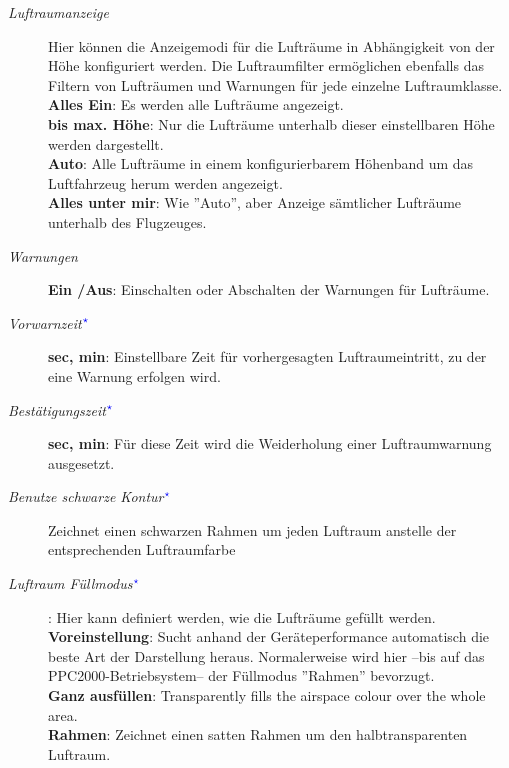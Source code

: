 \begin{description}
\item[\textit{Luftraumanzeige}]  Hier können die Anzeigemodi für die Lufträume in
Abhängigkeit von der Höhe konfiguriert werden.
Die Luftraumfilter ermöglichen ebenfalls das Filtern von Lufträumen und Warnungen für jede
 einzelne Luftraumklasse. \\
  {\bf Alles Ein}: Es werden alle Lufträume angezeigt.\\
  {\bf bis max. Höhe}: Nur die Lufträume unterhalb dieser einstellbaren Höhe werden dargestellt.\\
  {\bf Auto}: Alle Lufträume in einem konfigurierbarem Höhenband um das Luftfahrzeug herum werden angezeigt.
\\
  {\bf Alles unter mir}:  Wie ''Auto'', aber Anzeige sämtlicher Lufträume unterhalb des Flugzeuges.
\item[\textit{Warnungen}]  {\bf Ein /Aus}:  Einschalten oder Abschalten der Warnungen für Lufträume.
\item[\textit{Vorwarnzeit$^{\textcolor{blue}{\star}}$}]  {\bf sec, min}: Einstellbare Zeit für vorhergesagten Luftraumeintritt, zu der eine Warnung erfolgen wird.
\item[\textit{Bestätigungszeit$^{\textcolor{blue}{\star}}$}]  {\bf sec, min}: Für diese Zeit wird die Weiderholung einer Luftraumwarnung ausgesetzt.
\item[\textit{Benutze schwarze Kontur$^{\textcolor{blue}{\star}}$}] Zeichnet einen schwarzen Rahmen um jeden Luftraum anstelle der entsprechenden Luftraumfarbe
\item[\textit{Luftraum Füllmodus$^{\textcolor{blue}{\star}}$}]  {\bf }:  Hier kann definiert werden, wie die Lufträume gefüllt werden.\\
   {\bf Voreinstellung}: Sucht anhand der Geräteperformance automatisch die beste Art der Darstellung heraus.
    Normalerweise wird hier --bis auf das PPC2000-Betriebsystem-- der Füllmodus ''Rahmen'' bevorzugt.\\
    {\bf Ganz ausfüllen}:  Transparently fills the airspace colour over the whole area. \\
    {\bf Rahmen}: Zeichnet einen satten Rahmen um den halbtransparenten Luftraum. \\
\end{description}

